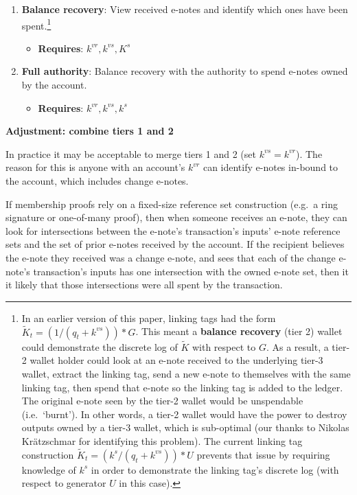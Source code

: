 \begin{itemize}
\begin{enumerate}
        \item \textbf{Balance recovery}: View received e-notes and identify which ones have been spent.\footnote{In an earlier version of this paper, linking tags had the form $\tilde{K}_t = (1/(q_t + k^{vs}))*G$. This meant a \textbf{balance recovery} (tier 2) wallet could demonstrate the discrete log of $\tilde{K}$ with respect to $G$. As a result, a tier-2 wallet holder could look at an e-note received to the underlying tier-3 wallet, extract the linking tag, send a new e-note to themselves with the same linking tag, then spend that e-note so the linking tag is added to the ledger. The original e-note seen by the tier-2 wallet would be unspendable (i.e.\ `burnt'). In other words, a tier-2 wallet would have the power to destroy outputs owned by a tier-3 wallet, which is sub-optimal (our thanks to Nikolas Kr{\"{a}}tzschmar for identifying this problem). The current linking tag construction $\tilde{K}_t = (k^s/(q_t + k^{vs}))*U$ prevents that issue by requiring knowledge of $k^s$ in order to demonstrate the linking tag's discrete log (with respect to generator $U$ in this case).}
        \begin{itemize}
            \item \textbf{Requires}: $k^{vr}, k^{vs}, K^s$
        \end{itemize}

        \item \textbf{Full authority}: Balance recovery with the authority to spend e-notes owned by the account.
        \begin{itemize}
            \item \textbf{Requires}: $k^{vr}, k^{vs}, k^s$
        \end{itemize}
    \end{enumerate}
\end{itemize}

\textbf{Adjustment: combine tiers 1 and 2}

In practice it may be acceptable to merge tiers 1 and 2 (set $k^{vs} = k^{vr}$). The reason for this is anyone with an account's $k^{vr}$ can identify e-notes in-bound to the account, which includes change e-notes.

If membership proofs rely on a fixed-size reference set construction (e.g.\ a ring signature or one-of-many proof), then when someone receives an e-note, they can look for intersections between the e-note's transaction's inputs' e-note reference sets and the set of prior e-notes received by the account. If the recipient believes the e-note they received was a change e-note, and sees that each of the change e-note's transaction's inputs has one intersection with the owned e-note set, then it it likely that those intersections were all spent by the transaction.

